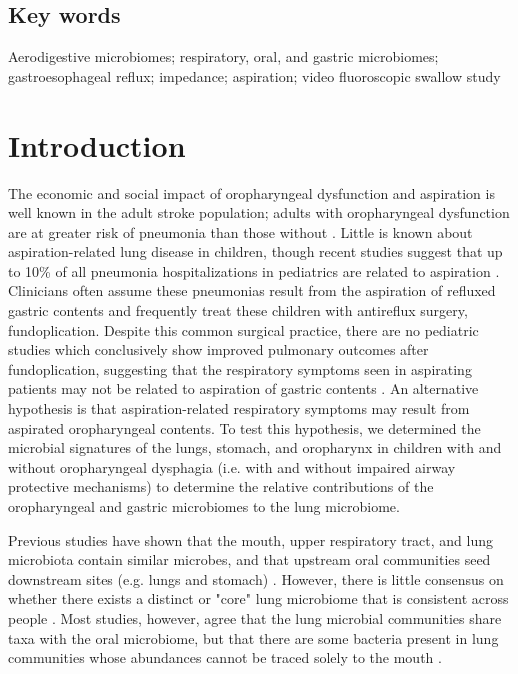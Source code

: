 \documentclass{article}
\begin{document}
\subsection{Key words}

Aerodigestive microbiomes; respiratory, oral, and gastric microbiomes; gastroesophageal reflux; impedance; aspiration; video fluoroscopic swallow study

\section{Introduction}



The economic and social impact of oropharyngeal dysfunction and aspiration is well known in the adult stroke population; adults with oropharyngeal dysfunction are at greater risk of pneumonia than those without \cite{holas1994aspcomplications}. 
Little is known about aspiration-related lung disease in children, though recent studies suggest that up to 10\% of all pneumonia hospitalizations in pediatrics are related to aspiration \cite{thomson2016asppneumo}. 
Clinicians often assume these pneumonias result from the aspiration of refluxed gastric contents and frequently treat these children with antireflux surgery, fundoplication. 
Despite this common surgical practice, there are no pediatric studies which conclusively show improved pulmonary outcomes after fundoplication, suggesting that the respiratory symptoms seen in aspirating patients may not be related to aspiration of gastric contents \cite{barnhart2013fundo,lee2008fundo,goldin2006fundo,yeh2016,srivastava2009fundo}. 
An alternative hypothesis is that aspiration-related respiratory symptoms may result from aspirated oropharyngeal contents. 
To test this hypothesis, we determined the microbial signatures of the lungs, stomach, and oropharynx in children with and without oropharyngeal dysphagia (i.e. with and without impaired airway protective mechanisms) to determine the relative contributions of the oropharyngeal and gastric microbiomes to the lung microbiome.

Previous studies have shown that the mouth, upper respiratory tract, and lung microbiota contain similar microbes, and that upstream oral communities seed downstream sites (e.g. lungs and stomach) \cite{Bassis2015source,Charlson2011topographical,rosen2015ppi}. 
However, there is little consensus on whether there exists a distinct or "core" lung microbiome that is consistent across people \cite{Charlson2011topographical,venkataraman-2015-dispersal,segal-2013-pneumotypes,erbDownward-2011-COPD}. 
Most studies, however, agree that the lung microbial communities share taxa with the oral microbiome, but that there are some bacteria present in lung communities whose abundances cannot be traced solely to the mouth \cite{Charlson2011topographical,Bassis2015source,morris-2013-healthsmokers,segal-2013-pneumotypes}.
\end{document}
